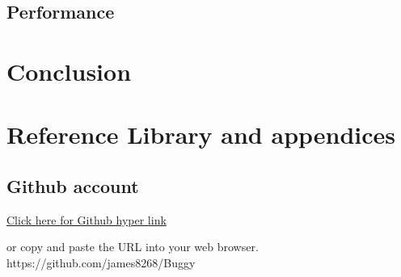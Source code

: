 \documentclass[8pt, a4paper]{article}
\begin{document}
\subsection{Performance}






\section{Conclusion}


\section{Reference Library and appendices}
\subsection{Github account}

\href{https://github.com/james8268/Buggy}{Click here for Github hyper link} 

or copy and paste the URL into your web browser. https://github.com/james8268/Buggy

\listoffigures
\end{document}
